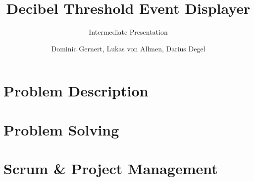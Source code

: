 \documentclass[authorontitle=true]{bfhbeamer}
\title{Decibel Threshold Event Displayer}
\subtitle{Intermediate Presentation}
\author{Dominic Gernert, Lukas von Allmen, Darius Degel}
\begin{document}
    \maketitle
    
    \section{Problem Description}\label{sec:problem-description}
    
    \section{Problem Solving}\label{sec:problem-solving}
    
    \section{Scrum \& Project Management}\label{sec:scrum-&-project-management}
    
\end{document}

